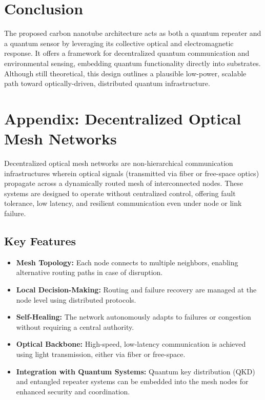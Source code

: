 \documentclass[11pt]{article}
\begin{document}
	\section{Conclusion}
	The proposed carbon nanotube architecture acts as both a quantum repeater and a quantum sensor by leveraging its collective optical and electromagnetic response. It offers a framework for decentralized quantum communication and environmental sensing, embedding quantum functionality directly into substrates. Although still theoretical, this design outlines a plausible low-power, scalable path toward optically-driven, distributed quantum infrastructure.
	
	\section*{Appendix: Decentralized Optical Mesh Networks}
	Decentralized optical mesh networks are non-hierarchical communication infrastructures wherein optical signals (transmitted via fiber or free-space optics) propagate across a dynamically routed mesh of interconnected nodes. These systems are designed to operate without centralized control, offering fault tolerance, low latency, and resilient communication even under node or link failure.
	
	\subsection*{Key Features}
	\begin{itemize}
		\item \textbf{Mesh Topology:} Each node connects to multiple neighbors, enabling alternative routing paths in case of disruption.
		\item \textbf{Local Decision-Making:} Routing and failure recovery are managed at the node level using distributed protocols.
		\item \textbf{Self-Healing:} The network autonomously adapts to failures or congestion without requiring a central authority.
		\item \textbf{Optical Backbone:} High-speed, low-latency communication is achieved using light transmission, either via fiber or free-space.
		\item \textbf{Integration with Quantum Systems:} Quantum key distribution (QKD) and entangled repeater systems can be embedded into the mesh nodes for enhanced security and coordination.
	\end{itemize}
	
\end{document}
